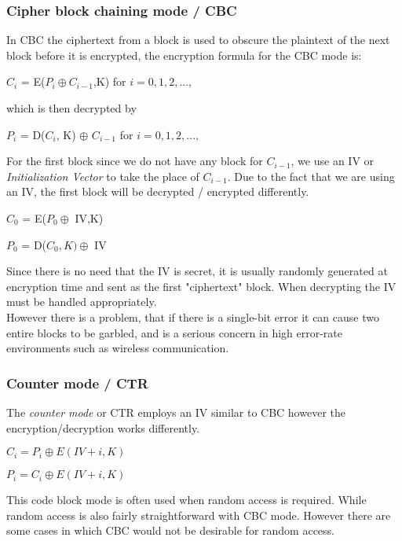 \documentclass{article}
\begin{document}
\subsubsection{Cipher block chaining mode / CBC}
In CBC the ciphertext from a block is used to obscure the plaintext of the next block before it is encrypted, the encryption formula for the CBC mode is:
\begin{center}
    $C_i$ = E($P_i \oplus C_{i-1}$,K) for $i = 0,1,2,...,$
\end{center}{}
which is then decrypted by
\begin{center}
    $P_i$ = D($C_i$, K) $\oplus$ $C_{i-1}$ for $i = 0,1,2,...,$
\end{center}{}
For the first block since we do not have any block for $C_{i-1}$, we use an IV or \textit{Initialization Vector} to take the place of $C_{i-1}$. Due to the fact that we are using an IV, the first block will be decrypted / encrypted differently.
\begin{center}
    $C_0$ = E($P_0 \oplus $ IV,K)
\end{center}{}
\begin{center}
    $P_0$ = D($C_0,K) \oplus $ IV
\end{center}{}
Since there is no need that the IV is secret, it is usually randomly generated at encryption time and sent as the first "ciphertext" block. When decrypting the IV must be handled appropriately.\\
However there is a problem, that if there is a single-bit error it can cause two entire blocks to be garbled, and is a serious concern in high error-rate environments such as wireless communication.

\subsubsection{Counter mode / CTR}
The \textit{counter mode} or CTR employs an IV similar to CBC however the encryption/decryption works differently.
\begin{center}
    $C_i = P_i \oplus E(IV + i,K)$
\end{center}{}
\begin{center}
    $P_i = C_i \oplus E(IV + i,K)$
\end{center}{}
This code block mode is often used when random access is required. While random access is also fairly straightforward with CBC mode. However there are some cases in which CBC would not be desirable for random access. 
\end{document}
